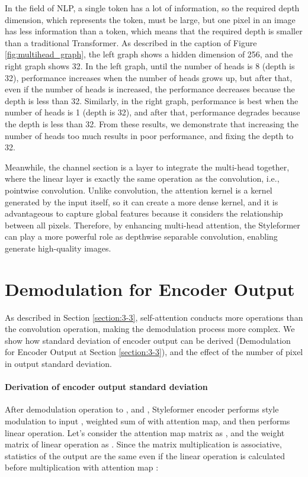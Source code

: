 \documentclass[10pt,twocolumn,letterpaper]{article}
\begin{document}
In the field of NLP, a single token has a lot of information, so the required depth dimension, which represents the token, must be large, but one pixel in an image has less information than a token, which means that the required depth is smaller than a traditional Transformer. 
As described in the caption of Figure \ref{fig:multihead_graph}, the left graph shows a hidden dimension of 256, and the right graph shows 32. In the left graph, until the number of heads is 8 (depth is 32), performance increases when the number of heads grows up, but after that, even if the number of heads is increased, the performance decreases because the depth is less than 32. Similarly, in the right graph, performance is best when the number of heads is 1 (depth is 32), and after that, performance degrades because the depth is less than 32.  From these results, we demonstrate that increasing the number of heads too much results in poor performance, and fixing the depth to 32.

Meanwhile, the channel section is a layer to integrate the multi-head together, where the linear layer is exactly the same operation as the  convolution, i.e., pointwise convolution.
Unlike convolution, the attention kernel is a kernel generated by the input itself, so it can create a more dense kernel, and it is advantageous to capture global features because it considers the relationship between all pixels.
Therefore, by enhancing multi-head attention, the Styleformer can play a more powerful role as depthwise separable convolution, enabling generate high-quality images.

\section{Demodulation for Encoder Output}
\label{app:D}
As described in Section \ref{section:3-3}, self-attention conducts more operations than the convolution operation, making the demodulation process more complex. We show how standard deviation of encoder output can be derived (Demodulation for Encoder Output at Section \ref{section:3-3}), and the effect of the number of pixel in output standard deviation.

\paragraph{Derivation of encoder output standard deviation}
After demodulation operation to ,  and , Styleformer encoder performs style modulation to input , weighted sum of  with attention map, and then performs linear operation. Let's consider the attention map matrix as , and the weight matrix of linear operation as . Since the matrix multiplication is associative, statistics of the output are the same even if the linear operation is calculated before multiplication with attention map :
\end{document}
